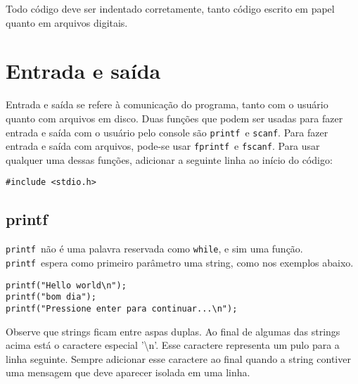 \documentclass{book}
\newcommand{\WHILE}{{\tt while}}
\newcommand{\PRINTF}{{\tt printf}}
\newcommand{\SCANF}{{\tt scanf}}
\newcommand{\FPRINTF}{{\tt fprintf}}
\newcommand{\FSCANF}{{\tt fscanf}}
\begin{document}
Todo código deve ser indentado corretamente, tanto código escrito em papel quanto em arquivos digitais.



\chapter{Entrada e saída}

Entrada e saída se refere à comunicação do programa, tanto com o usuário quanto com arquivos em disco. 
Duas funções que podem ser usadas para fazer entrada e saída com o usuário pelo console são \PRINTF\ e \SCANF. 
Para fazer entrada e saída com arquivos, pode-se usar \FPRINTF\ e \FSCANF. 
Para usar qualquer uma dessas funções, adicionar a seguinte linha ao início do código:

\begin{lstlisting}
#include <stdio.h> 
\end{lstlisting}



\section{printf}
\label{sec:printf}

\PRINTF\ não é uma palavra reservada como \WHILE, e sim uma função. \PRINTF\ espera como primeiro parâmetro uma string, como nos exemplos abaixo.

\begin{lstlisting}
printf("Hello world\n");
printf("bom dia");
printf("Pressione enter para continuar...\n");
\end{lstlisting}

Observe que strings ficam entre aspas duplas. Ao final de algumas das strings acima está o caractere especial '\textbackslash n'. Esse caractere representa um pulo para a linha seguinte. Sempre adicionar esse caractere ao final quando a string contiver uma mensagem que deve aparecer isolada em uma linha. 
\end{document}
